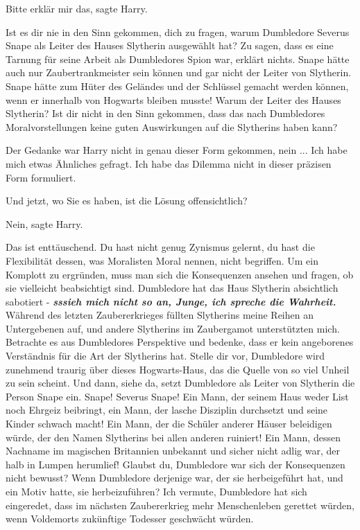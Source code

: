 \glqq{}Bitte erklär mir das\grqq{}, sagte Harry.

\glqq{}Ist es dir nie in den Sinn gekommen, dich zu fragen, warum Dumbledore
Severus Snape als Leiter des Hauses Slytherin ausgewählt hat? Zu sagen, dass es
eine Tarnung für seine Arbeit als Dumbledores Spion war, erklärt nichts. Snape
hätte auch nur Zaubertrankmeister sein können und gar nicht der Leiter von
Slytherin. Snape hätte zum Hüter des Geländes und der Schlüssel gemacht werden
können, wenn er innerhalb von Hogwarts bleiben musste! Warum der Leiter des
Hauses Slytherin? Ist dir nicht in den Sinn gekommen, dass das nach Dumbledores
Moralvorstellungen keine guten Auswirkungen auf die Slytherins haben kann?\grqq{}

Der Gedanke war Harry nicht in genau dieser Form gekommen, nein ... \glqq{}Ich
habe mich etwas Ähnliches gefragt. Ich habe das Dilemma nicht in dieser präzisen
Form formuliert.\grqq{}

\glqq{}Und jetzt, wo Sie es haben, ist die Lösung offensichtlich?\grqq{}

\glqq{}Nein\grqq{}, sagte Harry.

\glqq{}Das ist enttäuschend. Du hast nicht genug Zynismus gelernt, du hast die
Flexibilität dessen, was Moralisten Moral nennen, nicht begriffen. Um ein
Komplott zu ergründen, muss man sich die Konsequenzen ansehen und fragen, ob sie
vielleicht beabsichtigt sind. Dumbledore hat das Haus Slytherin absichtlich
sabotiert - \textbf{\emph{sssieh mich nicht so an, Junge, ich spreche die
Wahrheit.}} Während des letzten Zaubererkrieges füllten Slytherins meine Reihen
an Untergebenen auf, und andere Slytherins im Zaubergamot unterstützten mich.
Betrachte es aus Dumbledores Perspektive und bedenke, dass er kein angeborenes
Verständnis für die Art der Slytherins hat. Stelle dir vor, Dumbledore wird
zunehmend traurig über dieses Hogwarts-Haus, das die Quelle von so viel Unheil
zu sein scheint. Und dann, siehe da, setzt Dumbledore als Leiter von Slytherin
die Person Snape ein. Snape! Severus Snape! Ein Mann, der seinem Haus weder List
noch Ehrgeiz beibringt, ein Mann, der lasche Disziplin durchsetzt und seine
Kinder schwach macht! Ein Mann, der die Schüler anderer Häuser beleidigen würde,
der den Namen Slytherins bei allen anderen ruiniert! Ein Mann, dessen Nachname
im magischen Britannien unbekannt und sicher nicht adlig war, der halb in Lumpen
herumlief! Glaubst du, Dumbledore war sich der Konsequenzen nicht bewusst? Wenn
Dumbledore derjenige war, der sie herbeigeführt hat, und ein Motiv hatte, sie
herbeizuführen? Ich vermute, Dumbledore hat sich eingeredet, dass im nächsten
Zaubererkrieg mehr Menschenleben gerettet würden, wenn Voldemorts zukünftige
Todesser geschwächt würden.\grqq{}


